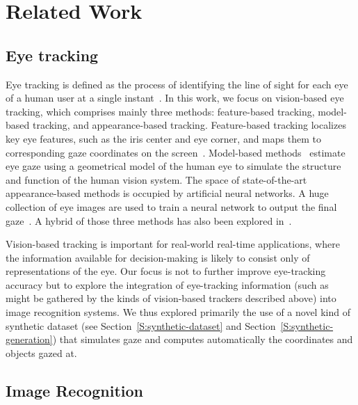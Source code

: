 \section{Related Work}

\subsection{Eye tracking}

Eye tracking is defined as the process of identifying the line of sight for each
eye of a human user at a single instant~\cite{kim2019nvgaze}. In this work, we
focus on vision-based eye tracking, which comprises mainly three methods:
feature-based tracking, model-based tracking, and appearance-based tracking.
Feature-based tracking localizes key eye features, such as the iris center and
eye corner, and maps them to corresponding gaze coordinates on the
screen~\cite{sesma2012evaluation, torricelli2008neural}. Model-based
methods~\cite{wood20163d, wang2017real} estimate eye gaze using a geometrical
model of the human eye to simulate the structure and function of the human
vision system. The space of state-of-the-art appearance-based methods is
occupied by artificial neural networks. A huge collection of eye images are used
to train a neural network to output the final gaze~\cite{zhang2015appearance,
schneider2014manifold, sugano2014learning}. A hybrid of those three methods has
also been explored in~\cite{kim2019nvgaze, wang2018hierarchical}.

Vision-based tracking is important for real-world real-time applications, where
the information available for decision-making is likely to consist only of
representations of the eye. Our focus is not to further improve eye-tracking
accuracy but to explore the integration of eye-tracking information (such as
might be gathered by the kinds of vision-based trackers described above) into
image recognition systems. We thus explored primarily the use of a novel kind of
synthetic dataset (see Section~\ref{S:synthetic-dataset} and
Section~\ref{S:synthetic-generation}) that simulates gaze and computes
automatically the coordinates and objects gazed at.

\subsection{Image Recognition}

